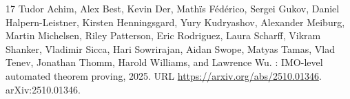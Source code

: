 \documentclass[a4paper,11pt,reqno]{amsart}
\theoremstyle{plain}
\theoremstyle{definition}
\theoremstyle{remark}
\begin{document}
\begin{thebibliography}{17}
Tudor Achim, Alex Best, Kevin Der, Math{\"i}s F{\'e}d{\'e}rico, Sergei Gukov,
  Daniel Halpern-Leistner, Kirsten Henningsgard, Yury Kudryashov, Alexander
  Meiburg, Martin Michelsen, Riley Patterson, Eric Rodriguez, Laura Scharff,
  Vikram Shanker, Vladimir Sicca, Hari Sowrirajan, Aidan Swope, Matyas Tamas,
  Vlad Tenev, Jonathan Thomm, Harold Williams, and Lawrence Wu.
: {IMO}-level automated theorem proving, 2025.
\newblock URL \url{https://arxiv.org/abs/2510.01346}.
\newblock arXiv:2510.01346.

\end{thebibliography}
\end{document}
